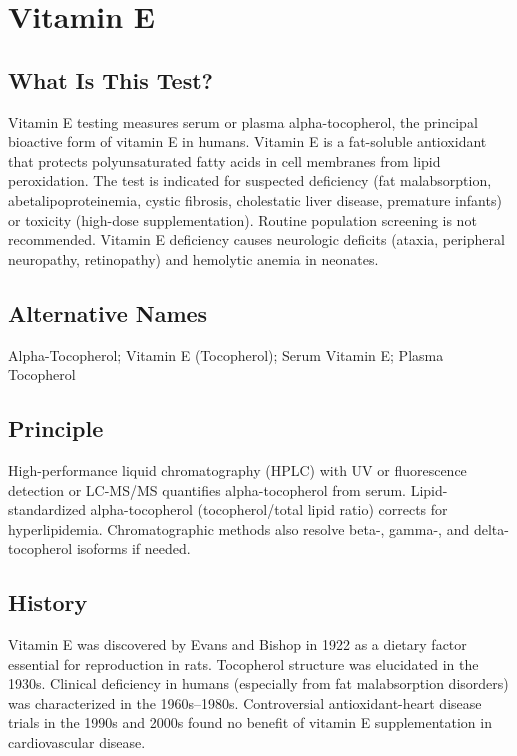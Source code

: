 \chapter{Vitamin E}

\section*{What Is This Test?}
Vitamin E testing measures serum or plasma alpha-tocopherol, the principal bioactive form of vitamin E in humans. Vitamin E is a fat-soluble antioxidant that protects polyunsaturated fatty acids in cell membranes from lipid peroxidation. The test is indicated for suspected deficiency (fat malabsorption, abetalipoproteinemia, cystic fibrosis, cholestatic liver disease, premature infants) or toxicity (high-dose supplementation). Routine population screening is not recommended. Vitamin E deficiency causes neurologic deficits (ataxia, peripheral neuropathy, retinopathy) and hemolytic anemia in neonates.

\section*{Alternative Names}
Alpha-Tocopherol; Vitamin E (Tocopherol); Serum Vitamin E; Plasma Tocopherol

\section*{Principle}
High-performance liquid chromatography (HPLC) with UV or fluorescence detection or LC-MS/MS quantifies alpha-tocopherol from serum. Lipid-standardized alpha-tocopherol (tocopherol/total lipid ratio) corrects for hyperlipidemia. Chromatographic methods also resolve beta-, gamma-, and delta-tocopherol isoforms if needed.

\section*{History}
Vitamin E was discovered by Evans and Bishop in 1922 as a dietary factor essential for reproduction in rats. Tocopherol structure was elucidated in the 1930s. Clinical deficiency in humans (especially from fat malabsorption disorders) was characterized in the 1960s--1980s. Controversial antioxidant-heart disease trials in the 1990s and 2000s found no benefit of vitamin E supplementation in cardiovascular disease.

